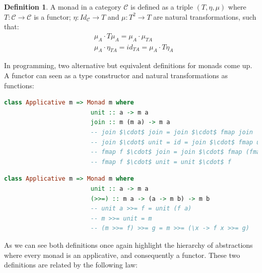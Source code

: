 \documentclass[
  oneside,
  11pt, a4paper,
  footinclude=true,
  headinclude=true,
  cleardoublepage=empty
]{scrbook}
\theoremstyle{definition}
\newtheorem{definition}{Definition}[section]
\theoremstyle{definition}
\begin{document}
	            \begin{definition}{A monad in a category $\mathscr{C}$ is defined as a triple $(T,\eta, \mu)$ where $T : \mathscr{C} \rightarrow \mathscr{C}$ is a functor; $\eta : Id_\mathscr{C} \rightarrow T$ and $\mu : T^2 \rightarrow T$ are natural transformations, such that:}
	                \begin{align*}
	                    &\mu_A \cdot T\mu_A = \mu_A \cdot \mu_{TA} \\
	                    &\mu_A \cdot \eta_{TA} = id_{TA} = \mu_A \cdot T\eta_A
	                \end{align*}{}
	            \end{definition}
	            
	            In programming, two alternative but equivalent definitions for monads come up. A functor can seen as a type constructor and natural transformations as functions:
	            
	            \begin{lstlisting}[mathescape, language=Haskell, caption={Monad laws and definition in terms of \texttt{unit} and \texttt{join}},captionpos=b]
	                class Applicative m => Monad m where
	                    unit :: a -> m a
	                    join :: m (m a) -> m a
	                    -- join $\cdot$ join = join $\cdot$ fmap join
	                    -- join $\cdot$ unit = id = join $\cdot$ fmap unit
	                    -- fmap f $\cdot$ join = join $\cdot$ fmap (fmap f)
	                    -- fmap f $\cdot$ unit = unit $\cdot$ f
	            \end{lstlisting}{}
	            
	            \begin{lstlisting}[mathescape, language=Haskell, caption={Monad laws and definition in terms of \texttt{unit} and \texttt{bind}},captionpos=b]
	                class Applicative m => Monad m where
	                    unit :: a -> m a
	                    (>>=) :: m a -> (a -> m b) -> m b
	                    -- unit a >>= f = unit (f a)
	                    -- m >>= unit = m
	                    -- (m >>= f) >>= g = m >>= (\x -> f x >>= g)
	            \end{lstlisting}{}
	            
	            As we can see both definitions once again highlight the hierarchy of abstractions where every monad is an applicative, and consequently a functor. These two definitions are related by the following law:
	            
\end{document}
